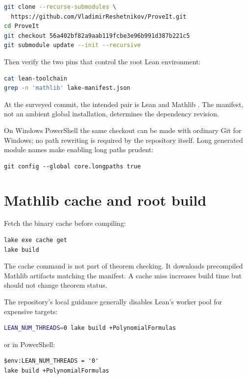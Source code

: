 \documentclass[
  10pt,
  a4paper,
  twoside,
  open=any,
  parskip=half,
  headings=big
]{scrreprt}
\newcommand{\code}[1]{\texttt{\detokenize{#1}}}
\begin{document}
\begin{lstlisting}[language=bash]
git clone --recurse-submodules \
  https://github.com/VladimirReshetnikov/ProveIt.git
cd ProveIt
git checkout 56a402bf82a9aab119fcbe3e96b991d387b221c5
git submodule update --init --recursive
\end{lstlisting}

Then verify the two pins that control the root Lean environment:

\begin{lstlisting}[language=bash]
cat lean-toolchain
grep -n 'mathlib' lake-manifest.json
\end{lstlisting}

At the surveyed commit, the intended pair is Lean \code{4.32.0} and Mathlib \code{v4.32.0}. The manifest, not an ambient global installation, determines the dependency revision.

On Windows PowerShell the same checkout can be made with ordinary Git for Windows; no path rewriting is required by the repository itself. Long generated module names make enabling long paths prudent:

\begin{lstlisting}
git config --global core.longpaths true
\end{lstlisting}

\section{Mathlib cache and root build}

Fetch the binary cache before compiling:

\begin{lstlisting}[language=bash]
lake exe cache get
lake build
\end{lstlisting}

The cache command is not part of theorem checking. It downloads precompiled Mathlib artifacts matching the manifest. A cache miss increases build time but should not change theorem status.

The repository's local guidance generally disables Lean's worker pool for expensive targets:

\begin{lstlisting}[language=bash]
LEAN_NUM_THREADS=0 lake build +PolynomialFormulas
\end{lstlisting}

or in PowerShell:

\begin{lstlisting}
$env:LEAN_NUM_THREADS = '0'
lake build +PolynomialFormulas
\end{lstlisting}
\end{document}
